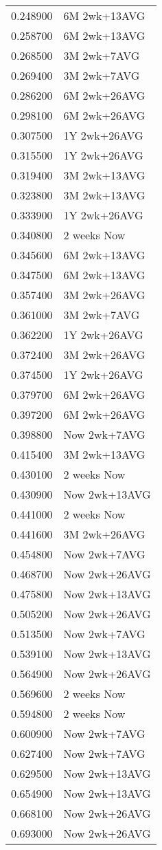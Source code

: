 \begin{tabular}{rl}
0.248900 & 6M 2wk+13AVG \\
0.258700 & 6M 2wk+13AVG \\
0.268500 & 3M 2wk+7AVG \\
0.269400 & 3M 2wk+7AVG \\
0.286200 & 6M 2wk+26AVG \\
0.298100 & 6M 2wk+26AVG \\
0.307500 & 1Y 2wk+26AVG \\
0.315500 & 1Y 2wk+26AVG \\
0.319400 & 3M 2wk+13AVG \\
0.323800 & 3M 2wk+13AVG \\
0.333900 & 1Y 2wk+26AVG \\
0.340800 & 2 weeks Now \\
0.345600 & 6M 2wk+13AVG \\
0.347500 & 6M 2wk+13AVG \\
0.357400 & 3M 2wk+26AVG \\
0.361000 & 3M 2wk+7AVG \\
0.362200 & 1Y 2wk+26AVG \\
0.372400 & 3M 2wk+26AVG \\
0.374500 & 1Y 2wk+26AVG \\
0.379700 & 6M 2wk+26AVG \\
0.397200 & 6M 2wk+26AVG \\
0.398800 & Now 2wk+7AVG \\
0.415400 & 3M 2wk+13AVG \\
0.430100 & 2 weeks Now \\
0.430900 & Now 2wk+13AVG \\
0.441000 & 2 weeks Now \\
0.441600 & 3M 2wk+26AVG \\
0.454800 & Now 2wk+7AVG \\
0.468700 & Now 2wk+26AVG \\
0.475800 & Now 2wk+13AVG \\
0.505200 & Now 2wk+26AVG \\
0.513500 & Now 2wk+7AVG \\
0.539100 & Now 2wk+13AVG \\
0.564900 & Now 2wk+26AVG \\
0.569600 & 2 weeks Now \\
0.594800 & 2 weeks Now \\
0.600900 & Now 2wk+7AVG \\
0.627400 & Now 2wk+7AVG \\
0.629500 & Now 2wk+13AVG \\
0.654900 & Now 2wk+13AVG \\
0.668100 & Now 2wk+26AVG \\
0.693000 & Now 2wk+26AVG \\
\hline
\end{tabular}